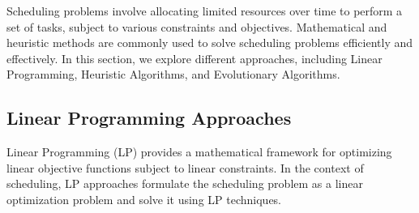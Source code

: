 \documentclass[12pt]{book} %
\begin{document}
Scheduling problems involve allocating limited resources over time to perform a set of tasks, subject to various constraints and objectives. Mathematical and heuristic methods are commonly used to solve scheduling problems efficiently and effectively. In this section, we explore different approaches, including Linear Programming, Heuristic Algorithms, and Evolutionary Algorithms.

\subsection{Linear Programming Approaches}

Linear Programming (LP) provides a mathematical framework for optimizing linear objective functions subject to linear constraints. In the context of scheduling, LP approaches formulate the scheduling problem as a linear optimization problem and solve it using LP techniques.
\end{document}
